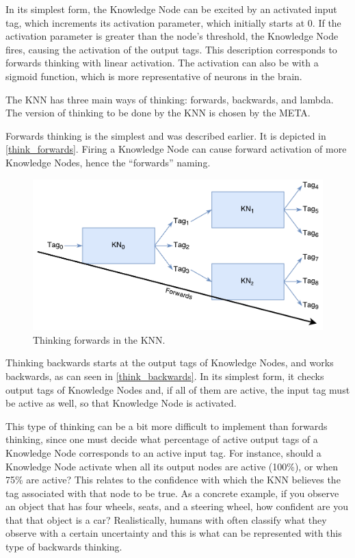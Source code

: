 \documentclass[titlepage,11pt]{article}
\begin{document}
In its simplest form, the Knowledge Node can be excited by an activated input tag, which increments its activation parameter, which initially starts at 0. If the activation parameter is greater than the node's threshold, the Knowledge Node fires, causing the activation of the output tags. This description corresponds to forwards thinking with linear activation. The activation can also be with a sigmoid function, which is more representative of neurons in the brain.

The KNN has three main ways of thinking: forwards, backwards, and lambda. The version of thinking to be done by the KNN is chosen by the META.

Forwards thinking is the simplest and was described earlier. It is depicted in \autoref{think_forwards}. Firing a Knowledge Node can cause forward activation of more Knowledge Nodes, hence the ``forwards'' naming.

\begin{figure}[!htb]
	\includegraphics[width=\columnwidth]{figures/forwards_thinking.pdf}
	\caption{Thinking forwards in the KNN.}
	\label{think_forwards}
\end{figure}

Thinking backwards starts at the output tags of Knowledge Nodes, and works backwards, as can seen in \autoref{think_backwards}. In its simplest form, it checks output tags of Knowledge Nodes and, if all of them are active, the input tag must be active as well, so that Knowledge Node is activated.

This type of thinking can be a bit more difficult to implement than forwards thinking, since one must decide what percentage of active output tags of a Knowledge Node corresponds to an active input tag. For instance, should a Knowledge Node activate when all its output nodes are active (100\%), or when 75\% are active? This relates to the confidence with which the KNN believes the tag associated with that node to be true. As a concrete example, if you observe an object that has four wheels, seats, and a steering wheel, how confident are you that that object is a car? Realistically, humans with often classify what they observe with a certain uncertainty and this is what can be represented with this type of backwards thinking.
\end{document}
